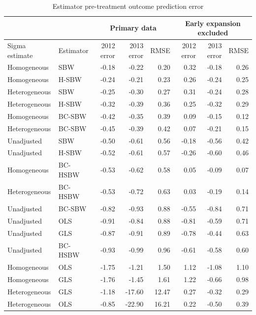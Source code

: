 \captionsetup[table]{labelformat=empty,skip=1pt}
\begin{table}[]
    \centering
\begin{longtable}{llrrr|rrr}\caption{Estimator pre-treatment outcome prediction error}\label{tab:pretxpredfull}
\hline
 &  & \multicolumn{3}{c}{Primary data} & \multicolumn{3}{c}{Early expansion 
 excluded} \\
 \hline
Sigma estimate & Estimator & 2012 error & 2013 error & RMSE & 2012 error & 2013 error & RMSE \\ 
\hline
Homogeneous & SBW & -0.18 & -0.22 & 0.20 & 0.32 & -0.18 & 0.26 \\ 
Homogeneous & H-SBW & -0.24 & -0.21 & 0.23 & 0.26 & -0.24 & 0.25 \\ 
Heterogeneous & SBW & -0.25 & -0.30 & 0.27 & 0.31 & -0.24 & 0.28 \\ 
Heterogeneous & H-SBW & -0.32 & -0.39 & 0.36 & 0.25 & -0.32 & 0.29 \\ 
Homogeneous & BC-SBW & -0.42 & -0.35 & 0.39 & 0.09 & -0.15 & 0.12 \\ 
Heterogeneous & BC-SBW & -0.45 & -0.39 & 0.42 & 0.07 & -0.21 & 0.15 \\ 
Unadjusted & SBW & -0.50 & -0.61 & 0.56 & -0.18 & -0.56 & 0.42 \\ 
Unadjusted & H-SBW & -0.52 & -0.61 & 0.57 & -0.26 & -0.60 & 0.46 \\ 
Homogeneous & BC-HSBW & -0.53 & -0.62 & 0.58 & 0.05 & -0.09 & 0.07 \\ 
Heterogeneous & BC-HSBW & -0.53 & -0.72 & 0.63 & 0.03 & -0.19 & 0.14 \\ 
Unadjusted & BC-SBW & -0.82 & -0.93 & 0.88 & -0.55 & -0.84 & 0.71 \\ 
Unadjusted & OLS & -0.91 & -0.84 & 0.88 & -0.81 & -0.59 & 0.71 \\ 
Unadjusted & GLS & -0.87 & -0.91 & 0.89 & -0.78 & -0.44 & 0.63 \\ 
Unadjusted & BC-HSBW & -0.93 & -0.99 & 0.96 & -0.61 & -0.58 & 0.60 \\ 
Homogeneous & OLS & -1.75 & -1.21 & 1.50 & 1.12 & -1.08 & 1.10 \\ 
Homogeneous & GLS & -1.76 & -1.45 & 1.61 & 1.22 & -0.66 & 0.98 \\ 
Heterogeneous & GLS & -1.18 & -17.60 & 12.47 & 0.27 & -0.32 & 0.29 \\ 
Heterogeneous & OLS & -0.85 & -22.90 & 16.21 & 0.22 & -0.50 & 0.39 \\ 
 \hline
\end{longtable}
\end{table}

